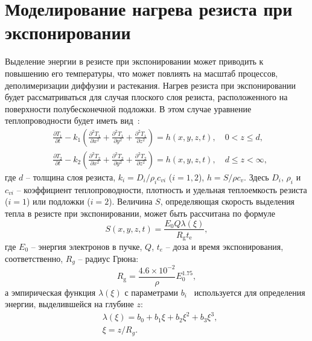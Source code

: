 \section{Моделирование нагрева резиста при экспонировании}

Выделение энергии в резисте при экспонировании может приводить к повышению его температуры, что может повлиять на масштаб процессов, деполимеризации диффузии и растекания. Нагрев резиста при экспонировании будет рассматриваться для случая плоского слоя резиста, расположенного на поверхности полубесконечной подложки. В этом случае уравнение теплопроводности будет иметь вид~\cite{Cui_heating}:
\begin{equation} \label{eq:heat_diffusion}
	\begin{aligned}
		& \frac{\partial T_1}{\partial t}-k_1\left(\frac{\partial^2 T_1}{\partial x^2}+\frac{\partial^2 T_1}{\partial y^2}+\frac{\partial^2 T_1}{\partial z^2}\right) = h(x, y, z, t), \quad 0 < z \leqslant d, \\
		& \frac{\partial T_2}{\partial t}-k_2\left(\frac{\partial^2 T_2}{\partial x^2}+\frac{\partial^2 T_2}{\partial y^2}+\frac{\partial^2 T_2}{\partial z^2}\right) = h(x, y, z, t), \quad d \leqslant z < \infty,
	\end{aligned}
\end{equation}
где $d$ -- толщина слоя резиста, $k_i = D_i / \rho_i c_{v i}$ ($i=1,2$), $h=S / \rho c_{v}$. Здесь $D_i$, $\rho_i$ и $c_{v i}$  -- коэффициент теплопроводности, плотность и удельная теплоемкость резиста ($i=1$) или подложки ($i=2$). Величина $S$, определяющая скорость выделения тепла в резисте при экспонировании, может быть рассчитана по формуле
\begin{equation}
	S(x, y, z, t)=\frac{E_0 Q \lambda(\xi)}{R_{\mathrm{g}} t_{\mathrm{e}}},
\end{equation}
где $E_0$ -- энергия электронов в пучке, $Q$, $t_e$ -- доза и время экспонирования, соответственно, $R_g$ -- радиус Грюна:
\begin{equation}
	R_{\mathrm{g}}=\frac{4.6 \times 10^{-2}}{\rho} E_0^{1.75},
\end{equation}
а эмпирическая функция $\lambda(\xi)$ с параметрами $b_i$~\cite{Everhart_lambda} используется для определения энергии, выделившейся на глубине $z$:
\begin{equation}
	\begin{aligned}
	& \lambda(\xi)=b_0+b_1 \xi+b_2 \xi^2+b_3 \xi^3, \\
	& \xi=z/R_g.
	\end{aligned}
\end{equation}

